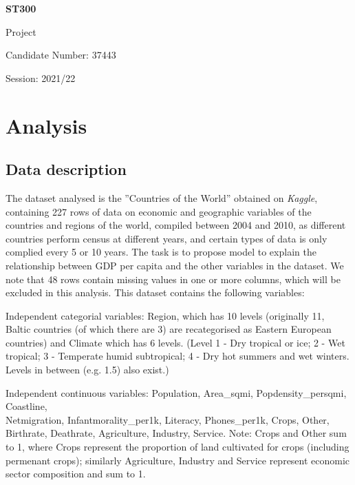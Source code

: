 \documentclass[12pt,a4paper]{article}
\renewcommand\texttt[1]{{\ttfamily\color{ttcolor}#1}}
\begin{document}
\begin{titlepage}
\vspace*{1cm}
\begin{center}
\Huge
\textbf{ST300}

\LARGE
Project

\vfill

\Large
Candidate Number: 37443

Session: 2021/22

\end{center}
\end{titlepage}
\section{Analysis}

\subsection{Data description}

The dataset analysed is the ''Countries of the World'' obtained on \textit{Kaggle}, containing 227 rows of data on economic and geographic variables of the countries and regions of the world, compiled between 2004 and 2010, as different countries perform census at different years, and certain types of data is only complied every 5 or 10 years.  The task is to propose model to explain the relationship between GDP per capita and the other variables in the dataset. We note that 48 rows contain missing values in one or more columns, which will be excluded in this analysis. This dataset contains the following variables:

Independent categorial variables: \texttt{Region}, which has 10 levels (originally 11, Baltic countries (of which there are 3) are recategorised as Eastern European countries) and \texttt{Climate} which has 6 levels. (Level 1 - Dry tropical or ice; 2 - Wet tropical; 3 - Temperate humid subtropical; 4 - Dry hot summers and wet winters. Levels in between (e.g. 1.5) also exist.)

Independent continuous variables: \texttt{Population}, \texttt{Area\_sqmi}, \texttt{Popdensity\_persqmi}, \texttt{Coastline},\\
 \texttt{Netmigration}, \texttt{Infantmorality\_per1k}, \texttt{Literacy}, \texttt{Phones\_per1k}, \texttt{Crops}, \texttt{Other}, \\
 \texttt{Birthrate}, \texttt{Deathrate}, \texttt{Agriculture}, \texttt{Industry}, \texttt{Service}. Note: \texttt{Crops} and \texttt{Other} sum to 1, where \texttt{Crops} represent the proportion of land cultivated for crops (including permenant crops);  similarly \texttt{Agriculture}, \texttt{Industry} and \texttt{Service} represent economic sector composition and sum to 1. 
\end{document}

